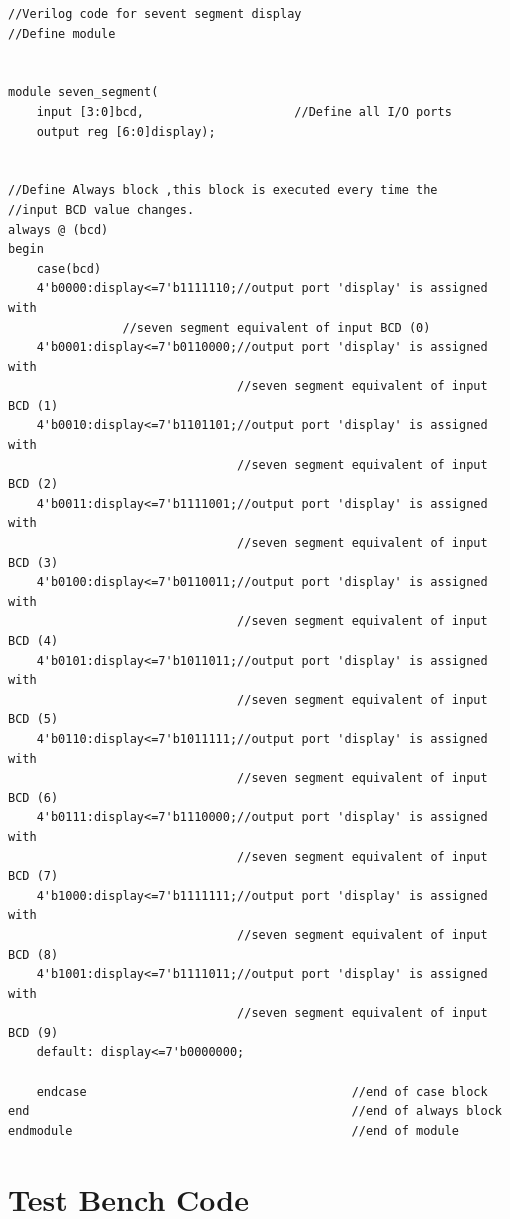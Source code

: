 \documentclass[12pt,singleside,a4paper]{article}
\begin{document}
\begin{lstlisting}[style =verilog-style,frame=single,linewidth = 18cm]
//Verilog code for sevent segment display
//Define module


module seven_segment(
	input [3:0]bcd,                     //Define all I/O ports
	output reg [6:0]display);


//Define Always block ,this block is executed every time the 
//input BCD value changes.
always @ (bcd)
begin
	case(bcd)
    4'b0000:display<=7'b1111110;//output port 'display' is assigned with  
    			//seven segment equivalent of input BCD (0)
    4'b0001:display<=7'b0110000;//output port 'display' is assigned with 
                                //seven segment equivalent of input BCD (1)
    4'b0010:display<=7'b1101101;//output port 'display' is assigned with  
                                //seven segment equivalent of input BCD (2)
    4'b0011:display<=7'b1111001;//output port 'display' is assigned with  
                                //seven segment equivalent of input BCD (3)
    4'b0100:display<=7'b0110011;//output port 'display' is assigned with  
                                //seven segment equivalent of input BCD (4)
    4'b0101:display<=7'b1011011;//output port 'display' is assigned with  
                                //seven segment equivalent of input BCD (5)
    4'b0110:display<=7'b1011111;//output port 'display' is assigned with  
                                //seven segment equivalent of input BCD (6)
    4'b0111:display<=7'b1110000;//output port 'display' is assigned with  
                                //seven segment equivalent of input BCD (7)
    4'b1000:display<=7'b1111111;//output port 'display' is assigned with 
                                //seven segment equivalent of input BCD (8)
    4'b1001:display<=7'b1111011;//output port 'display' is assigned with 
                                //seven segment equivalent of input BCD (9)
    default: display<=7'b0000000;
	
	endcase										//end of case block
end												//end of always block
endmodule										//end of module
\end{lstlisting}

\newpage
\section*{Test Bench Code}
\end{document}
